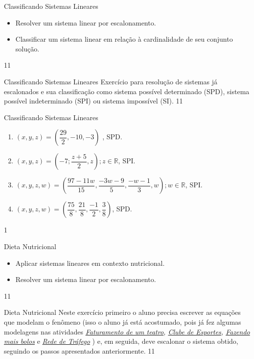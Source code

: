 \clearpage
\def\currentcolor{session2}
\begin{objectives}{Classificando Sistemas Lineares}
{
\begin{itemize}
\item Resolver um sistema linear por escalonamento.
\item Classificar um sistema linear em relação à cardinalidade de seu conjunto solução.
\end{itemize}
}{1}{1}
\end{objectives}
\marginpar{\vspace{-2em}}
\begin{sugestions}{Classificando Sistemas Lineares}
{
Exercício para resolução de sistemas já escalonados e sua classificação como sistema possível determinado (SPD), sistema possível indeterminado (SPI) ou sistema impossível (SI).
}{1}{1}
\end{sugestions}
\begin{answer}{Classificando Sistemas Lineares}
{
\begin{enumerate}
\item $(x,y,z)=(\dfrac{29}{2},-10,-3)$ , SPD.
\item $(x,y,z)=(-7;\dfrac{z+5}{2},z);z\in \mathbb{R}$, SPI.
\item $(x,y,z,w)=(\dfrac{97-11w}{15},\dfrac{-3w-9}{5}, \dfrac{-w-1}{3},w); w\in \mathbb{R}$, SPI.
\item $(x,y,z,w)=(\dfrac{75}{8},\dfrac{21}{8},\dfrac{-1}{2},\dfrac{3}{8})$, SPD.  
\end{enumerate}
}{1}
\end{answer}
\begin{objectives}{Dieta Nutricional}
{
\begin{itemize}
\item Aplicar sistemas lineares em contexto nutricional.
 \item Resolver um sistema linear por escalonamento. 
\end{itemize}
}{1}{1}
\end{objectives}
\marginpar{\vspace{-2em}}
\begin{sugestions}{Dieta Nutricional}
{
Neste exercício primeiro o aluno precisa escrever as equações que modelam o fenômeno (isso o aluno já está acostumado, pois já fez algumas modelagens nas atividades \textit{\hyperref[teatro]{Faturamento de um teatro}, \hyperref[clube]{Clube de Esportes}, \hyperref[mais_bolos]{Fazendo mais bolos}} e \textit{\hyperref[trafego]{Rede de Tráfego}} ) e, em seguida, deve escalonar o sistema obtido, seguindo os passos apresentados anteriormente.
}{1}{1}
\end{sugestions}

